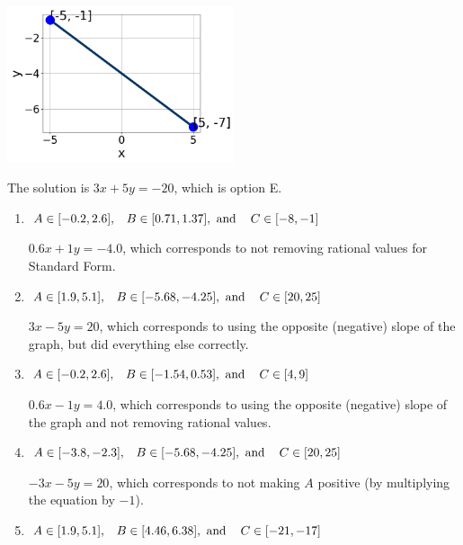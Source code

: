 \documentclass{extbook}[14pt]
\begin{document}
\begin{enumerate}
{\begin{center}
    \includegraphics[width=0.5\textwidth]{../Figures/linearGraphToStandardB.png}
\end{center}


The solution is \( 3x + 5y = -20 \), which is option E.\begin{enumerate}[label=\Alph*.]
\item \( A \in [-0.2, 2.6], \hspace{3mm} B \in [0.71, 1.37], \text{ and } \hspace{3mm} C \in [-8, -1] \)

 $0.6x + 1y = -4.0$, which corresponds to not removing rational values for Standard Form.
\item \( A \in [1.9, 5.1], \hspace{3mm} B \in [-5.68, -4.25], \text{ and } \hspace{3mm} C \in [20, 25] \)

 $3x - 5y = 20$, which corresponds to using the opposite (negative) slope of the graph, but did everything else correctly.
\item \( A \in [-0.2, 2.6], \hspace{3mm} B \in [-1.54, 0.53], \text{ and } \hspace{3mm} C \in [4, 9] \)

 $0.6x - 1y = 4.0$, which corresponds to using the opposite (negative) slope of the graph and not removing rational values.
\item \( A \in [-3.8, -2.3], \hspace{3mm} B \in [-5.68, -4.25], \text{ and } \hspace{3mm} C \in [20, 25] \)

 $-3x - 5y = 20$, which corresponds to not making $A$ positive (by multiplying the equation by $-1$).
\item \( A \in [1.9, 5.1], \hspace{3mm} B \in [4.46, 6.38], \text{ and } \hspace{3mm} C \in [-21, -17] \)


\end{enumerate}}
\end{enumerate}
\end{document}
